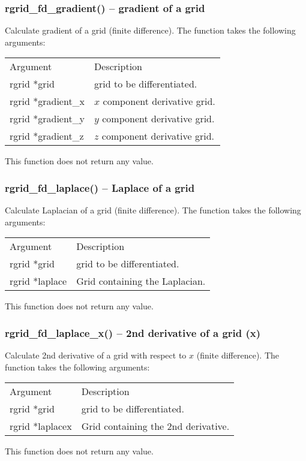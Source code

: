 \documentclass[12pt,letterpaper]{article}
\begin{document}
\subsubsection{rgrid\_fd\_gradient() -- gradient of a grid}

Calculate gradient of a grid (finite difference). The function takes the following arguments:
\begin{longtable}{p{} p{}}
Argument & Description\\
\cline{1-2}
rgrid *grid & grid to be differentiated.\\
rgrid *gradient\_x & $x$ component derivative grid.\\
rgrid *gradient\_y & $y$ component derivative grid.\\
rgrid *gradient\_z & $z$ component derivative grid.\\
\end{longtable}
\noindent
This function does not return any value.

\subsubsection{rgrid\_fd\_laplace() -- Laplace of a grid}

Calculate Laplacian of a grid (finite difference). The function takes the following arguments:
\begin{longtable}{p{} p{}}
Argument & Description\\
\cline{1-2}
rgrid *grid & grid to be differentiated.\\
rgrid *laplace & Grid containing the Laplacian.\\
\end{longtable}
\noindent
This function does not return any value.

\subsubsection{rgrid\_fd\_laplace\_x() -- 2nd derivative of a grid (x)}

Calculate 2nd derivative of a grid with respect to $x$ (finite difference). The function takes the following arguments:
\begin{longtable}{p{} p{}}
Argument & Description\\
\cline{1-2}
rgrid *grid & grid to be differentiated.\\
rgrid *laplacex & Grid containing the 2nd derivative.\\
\end{longtable}
\noindent
This function does not return any value.
\end{document}
